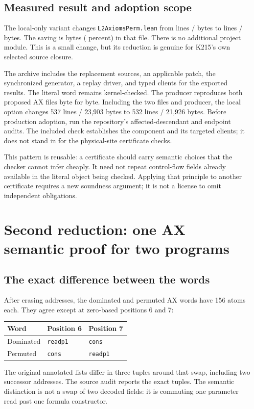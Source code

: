 \documentclass[11pt,letterpaper]{article}
\theoremstyle{definition}\newtheorem{definition}[theorem]{Definition}
\newcommand{\code}[1]{\texttt{#1}}
\begin{document}
\subsection{Measured result and adoption scope}

The local-only variant changes \code{L2AxiomsPerm.lean} from \OldPermLines{} lines /
\OldPermBytes{} bytes to \LocalPermLines{} lines / \LocalPermBytes{} bytes. The saving is
\LocalSavedBytes{} bytes (\LocalPercent{} percent) in that file. There is no additional
project module. This is a small change, but its reduction is genuine for K215's
own selected source closure.

The archive includes the replacement sources, an applicable patch, the synchronized
generator, a replay driver, and typed clients for the exported results. The literal
word remains kernel-checked. The producer reproduces both proposed AX files byte
for byte. Including the two files and producer, the local option changes 537 lines /
23,903 bytes to 532 lines / 21,926 bytes. Before production adoption, run the
repository's affected-descendant and endpoint audits. The included check establishes
the component and its targeted clients;
it does not stand in for the physical-site certificate checks.

This pattern is reusable: a certificate should carry semantic choices that the
checker cannot infer cheaply. It need not repeat control-flow fields already
available in the literal object being checked. Applying that principle to another
certificate requires a new soundness argument; it is not a license to omit
independent obligations.

\section{Second reduction: one AX semantic proof for two programs}

\subsection{The exact difference between the words}

After erasing addresses, the dominated and permuted AX words have 156 atoms each.
They agree except at zero-based positions 6 and 7:
\begin{center}
\begin{tabular}{lll}
\toprule
Word & Position 6 & Position 7 \\
\midrule
Dominated & \code{readp1} & \code{cons} \\
Permuted & \code{cons} & \code{readp1} \\
\bottomrule
\end{tabular}
\end{center}
The original annotated lists differ in three tuples around that swap, including
two successor addresses. The source audit reports the exact tuples. The semantic distinction is not
a swap of two decoded fields: it is commuting one parameter read past one formula
constructor.
\end{document}
